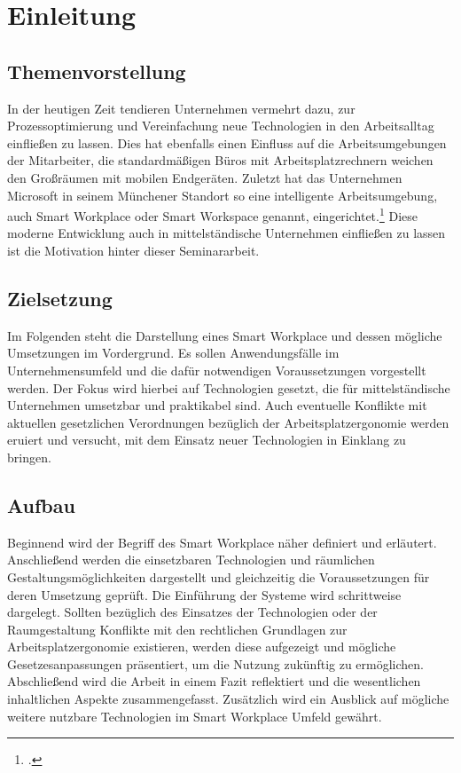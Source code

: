 \section{Einleitung}
\subsection{Themenvorstellung}
In der heutigen Zeit tendieren Unternehmen vermehrt dazu, zur Prozessoptimierung und Vereinfachung neue Technologien in den Arbeitsalltag einfließen zu lassen. Dies hat ebenfalls einen Einfluss auf die Arbeitsumgebungen der Mitarbeiter, die standardmäßigen Büros mit Arbeitsplatzrechnern weichen den Großräumen mit mobilen Endgeräten. Zuletzt hat das Unternehmen Microsoft in seinem Münchener Standort so eine intelligente Arbeitsumgebung, auch Smart Workplace oder Smart Workspace genannt, eingerichtet.\footcite[Vgl.][]{MicrosoftArtikel} Diese moderne Entwicklung auch in mittelständische Unternehmen einfließen zu lassen ist die Motivation hinter dieser Seminararbeit.

\subsection{Zielsetzung}
Im Folgenden steht die Darstellung eines Smart Workplace und dessen mögliche Umsetzungen im Vordergrund. Es sollen Anwendungsfälle im Unternehmensumfeld und die dafür notwendigen Voraussetzungen vorgestellt werden. Der Fokus wird hierbei auf Technologien gesetzt, die für mittelständische Unternehmen umsetzbar und praktikabel sind. Auch eventuelle Konflikte mit aktuellen gesetzlichen Verordnungen bezüglich der Arbeitsplatzergonomie werden eruiert und versucht, mit dem Einsatz neuer Technologien in Einklang zu bringen.

\subsection{Aufbau}
Beginnend wird der Begriff des Smart Workplace näher definiert und erläutert. Anschließend werden die einsetzbaren Technologien und räumlichen Gestaltungsmöglichkeiten dargestellt und gleichzeitig die Voraussetzungen für deren Umsetzung geprüft. Die Einführung der Systeme wird schrittweise dargelegt. Sollten bezüglich des Einsatzes der Technologien oder der Raumgestaltung Konflikte mit den rechtlichen Grundlagen zur Arbeitsplatzergonomie existieren, werden diese aufgezeigt und mögliche Gesetzesanpassungen präsentiert, um die Nutzung zukünftig zu ermöglichen. Abschließend wird die Arbeit in einem Fazit reflektiert und die wesentlichen inhaltlichen Aspekte zusammengefasst. Zusätzlich wird ein Ausblick auf mögliche weitere nutzbare Technologien im Smart Workplace Umfeld gewährt.